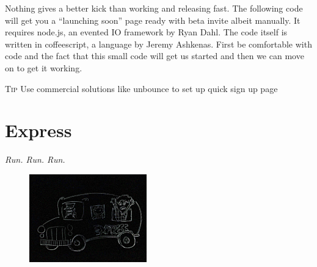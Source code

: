 \documentclass[12pt]{book}
\begin{document}
Nothing gives a better kick than working and releasing fast. The following code will get you a ``launching soon'' page ready with beta invite albeit manually. It requires node.js, an evented IO framework by Ryan Dahl. The code itself is written in coffeescript, a language by Jeremy Ashkenas.
First be comfortable with code and the fact that this small code will get us started and then we can move on to get it working.

\vspace{0.6cm}\vspace{0.6cm}

\colorbox{tipcolour}{\tiny \textsc{Tip} \small Use commercial solutions like unbounce to set up quick sign up page}






\chapter{Express}
\begin{flushright}\textit{Run. Run. Run.}\end{flushright}

\begin{figure}
\begin{center}\includegraphics[width=2in]{org/art/fasterEasier.png}\end{center}
\end{figure}
\end{document}
